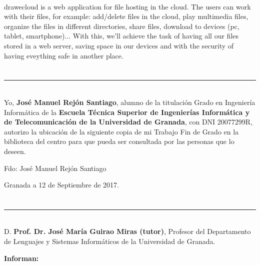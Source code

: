 \vspace{0.7cm}
\\

drawecloud is a web application for file hosting in the cloud. The users can work with their files, for example: add/delete files in the cloud, play multimedia files, organize the files in different directories, share files, download to devices (pc, tablet, smartphone)... With this, we'll achieve the task of having all our files stored in a web server, saving space in our devices and with the security of having eveything safe in another place.

\chapter*{}
\thispagestyle{empty}

\noindent\rule[-1ex]{\textwidth}{2pt}\\[4.5ex]

Yo, \textbf{José Manuel Rejón Santiago}, alumno de la titulación Grado en Ingeniería Informática de la \textbf{Escuela Técnica Superior
de Ingenierías Informática y de Telecomunicación de la Universidad de Granada}, con DNI 20077299R, autorizo la
ubicación de la siguiente copia de mi Trabajo Fin de Grado en la biblioteca del centro para que pueda ser
consultada por las personas que lo deseen.

\vspace{6cm}

\noindent Fdo: José Manuel Rejón Santiago

\vspace{2cm}

\begin{flushright}
Granada a 12 de Septiembre de 2017.
\end{flushright}


\chapter*{}
\thispagestyle{empty}

\noindent\rule[-1ex]{\textwidth}{2pt}\\[4.5ex]

D. \textbf{Prof. Dr. José María Guirao Miras (tutor)}, Profesor del Departamento de Lenguajes y Sistemas Informáticos de la Universidad de Granada.

\vspace{0.5cm}

\textbf{Informan:}

